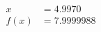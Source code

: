 \documentclass[preview]{standalone}
\begin{document}
\begin{align*}
x &= 4.9970\\f(x) &= 7.9999988
\end{align*}
\end{document}
